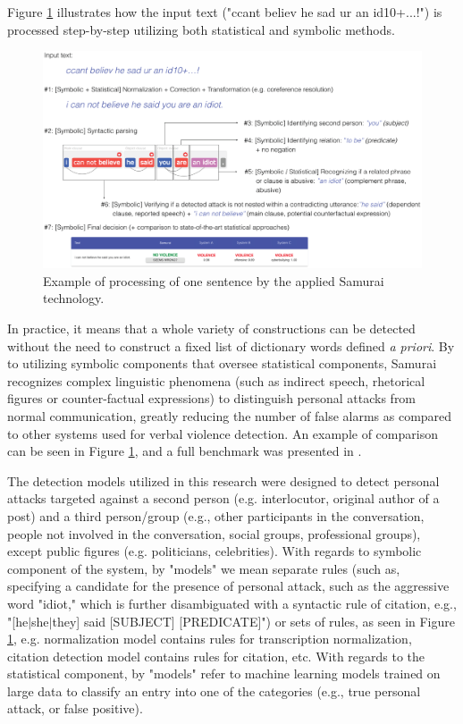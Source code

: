 \documentclass[a4paper,fleqn]{cas-dc}
\begin{document}
Figure \ref{fig:samuraiexample} illustrates how the input text ("ccant believ he sad ur an id10+...!") is processed step-by-step utilizing both statistical and symbolic methods.



\begin{figure}
    \centering
    \includegraphics[width=\textwidth]{images/example.eps}
    \caption{Example of processing of one sentence by the applied Samurai technology.}
    \label{fig:samuraiexample}
\end{figure}





In practice, it means that a whole variety of constructions can be detected without the need to construct a fixed list of dictionary words defined \textit{a priori}. By to utilizing symbolic components that oversee statistical components, \textsf{Samurai} recognizes complex linguistic phenomena (such as indirect speech, rhetorical figures or counter-factual expressions) to distinguish personal attacks from normal communication, greatly reducing the number of false alarms as compared to other systems used for verbal violence detection. An example of comparison can be seen in Figure \ref{fig:samuraiexample}, and a full benchmark was presented in \citep{ptaszynski2018cyberbullying}.





The detection models utilized in this research were designed to detect personal attacks targeted against a second person (e.g. interlocutor, original author of a post) and a third person/group (e.g., other participants in the conversation, people not involved in the conversation, social groups, professional groups), except public figures (e.g. politicians, celebrities). 
With regards to symbolic component of the system, by "models" we mean separate rules (such as, specifying a candidate for the presence of personal attack, such as the aggressive word "idiot," which is further disambiguated with a syntactic rule of citation, e.g., "[he$\vert$she$\vert$they] said [SUBJECT] [PREDICATE]") or sets of rules, as seen in Figure \ref{fig:samuraiexample}, e.g. normalization model contains rules for transcription normalization, citation detection model contains rules for citation, etc. With regards to the statistical component, by "models" refer to machine learning models trained on large data to classify an entry into one of the categories (e.g., true personal attack, or false positive).
\end{document}

